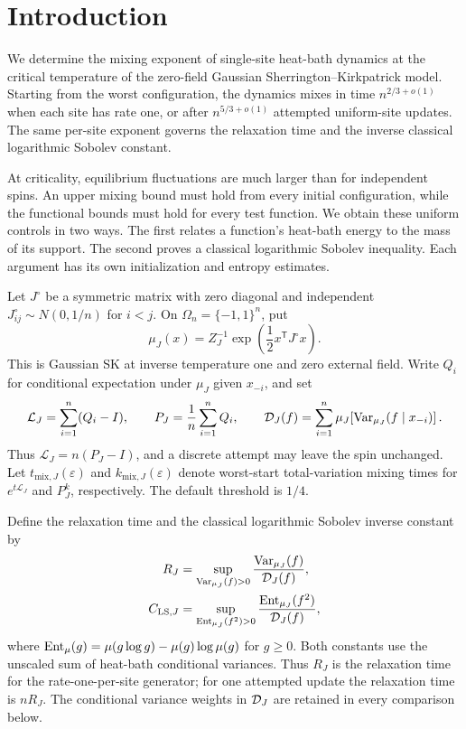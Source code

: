 \section{Introduction}\label{sec:introduction}

We determine the mixing exponent of single-site heat-bath dynamics
at the critical temperature of the zero-field Gaussian
Sherrington--Kirkpatrick model. Starting from the worst configuration,
the dynamics mixes in time $n^{2/3+o(1)}$ when each site has rate one,
or after $n^{5/3+o(1)}$ attempted uniform-site updates. The same
per-site exponent governs the relaxation time and the inverse classical
logarithmic Sobolev constant.

At criticality, equilibrium fluctuations are much larger than for
independent spins. An upper mixing bound must hold from every initial
configuration, while the functional bounds must hold for every test
function. We obtain these uniform controls in two ways. The first relates
a function's heat-bath energy to the mass of its support. The second proves
a classical logarithmic Sobolev inequality. Each argument has its own
initialization and entropy estimates.

Let $J^\circ$ be a symmetric matrix with zero diagonal and independent
$J^\circ_{ij}\sim N(0,1/n)$ for $i<j$. On $\Omega_n=\{-1,1\}^n$, put
\begin{equation}\label{eq:gibbs-law}
 \mu_J(x)=Z_J^{-1}\exp\!\left(\frac12x^{\mathsf T}J^\circ x\right).
\end{equation}
This is Gaussian SK at inverse temperature one and zero external field.
Write $Q_i$ for conditional expectation under $\mu_J$ given $x_{-i}$,
and set
\begin{equation}\label{eq:clock-conventions}
 \mathcal L_J=\sum_{i=1}^n(Q_i-I),\qquad
 P_J=\frac1n\sum_{i=1}^nQ_i,\qquad
 \mathcal D_J(f)=\sum_{i=1}^n\mu_J\!\left[\operatorname{Var}_{\mu_J}(f\mid x_{-i})\right].
\end{equation}
Thus $\mathcal L_J=n(P_J-I)$, and a discrete attempt may leave the spin
unchanged. Let $t_{\mathrm{mix},J}(\varepsilon)$ and
$k_{\mathrm{mix},J}(\varepsilon)$ denote worst-start total-variation
mixing times for $e^{t\mathcal L_J}$ and $P_J^k$, respectively.
The default threshold is $1/4$.

Define the relaxation time and the classical logarithmic Sobolev
inverse constant by
\begin{align}
 R_J&=\sup_{\operatorname{Var}_{\mu_J}(f)>0}\frac{\operatorname{Var}_{\mu_J}(f)}{\mathcal D_J(f)},
 \label{eq:relaxation-definition}\\
 C_{\mathrm{LS},J}&=\sup_{\operatorname{Ent}_{\mu_J}(f^2)>0}
               \frac{\operatorname{Ent}_{\mu_J}(f^2)}{\mathcal D_J(f)},
 \label{eq:lsi-definition}
\end{align}
where $\operatorname{Ent}_\mu(g)=\mu(g\log g)-\mu(g)\log\mu(g)$ for $g\ge0$.
Both constants use the unscaled sum of heat-bath conditional variances.
Thus $R_J$ is the relaxation time for the rate-one-per-site generator;
for one attempted update the relaxation time is $nR_J$. The conditional
variance weights in $\mathcal D_J$ are retained in every comparison below.

